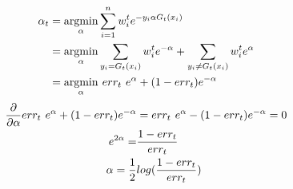 \documentclass{article}
\newenvironment{sub}[2][$-$]{\begin{trivlist}
		\item[\hskip \labelsep {\bfseries #1}\hskip \labelsep {\bfseries #2.}]}  {\end{trivlist}}
\begin{document}
\begin{sub}{7.3}
\end{sub}
\begin{align}
\alpha_t &= \underset{\alpha}{\operatorname{arg min}} \sum_{i=1}^n w_i^te^{-y_i\alpha G_t(x_i)}\\
&= \underset{\alpha}{\operatorname{arg min}} \sum_{y_i = G_t(x_i)} w_i^te^{-\alpha} +  \sum_{y_i \neq G_t(x_i)} w_i^t e^{\alpha}\\
& = \underset{\alpha}{\operatorname{arg min}} \hspace{0.05in} err_t \hspace{0.05in} e^{ \alpha} + (1-err_t)e^{ -\alpha}\end{align}
\begin{align}
\frac{\partial }{\partial \alpha } err_t \hspace{0.05in} e^{ \alpha} + (1-err_t)e^{ -\alpha}   &= err_t \hspace{0.05in} e^{ \alpha} - (1-err_t)e^{ -\alpha} = 0\\
e^{2\alpha} = & \frac{1-err_t}{err_t}\\
\alpha = \frac{1}{2}& log(\frac{1-err_t}{err_t})
\end{align}
\end{document}
